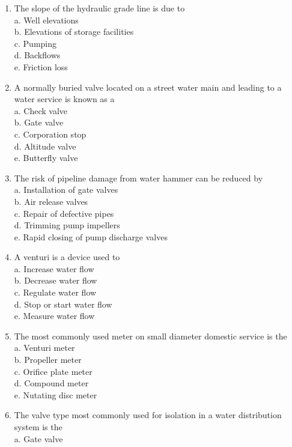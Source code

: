 \documentclass{article}
\begin{document}
\begin{enumerate}[1.]
  \item The slope of the hydraulic grade line is due to\\
a. Well elevations\\
b. Elevations of storage facilities\\
c. Pumping\\
d. Backflows\\
e. Friction loss\\

  \item A normally buried valve located on a street water main and leading to a water service is known as a\\
a. Check valve\\
b. Gate valve\\
c. Corporation stop\\
d. Altitude valve\\
e. Butterfly valve\\

  \item The risk of pipeline damage from water hammer can be reduced by\\
a. Installation of gate valves\\
b. Air release valves\\
c. Repair of defective pipes\\
d. Trimming pump impellers\\
e. Rapid closing of pump discharge valves \\

\item A venturi is a device used to\\
a. Increase water flow\\
b. Decrease water flow\\
c. Regulate water flow\\
d. Stop or start water flow\\
e. Measure water flow\\

  \item The most commonly used meter on small diameter domestic service is the\\
a. Venturi meter\\
b. Propeller meter\\
c. Orifice plate meter\\
d. Compound meter\\
e. Nutating disc meter\\

  \item The valve type most commonly used for isolation in a water distribution system is the\\
a. Gate valve\\


\end{enumerate}
\end{document}
